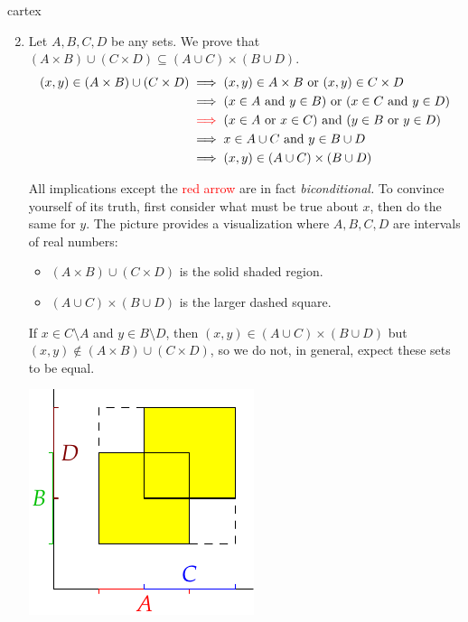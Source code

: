 \begin{examples}{}{cartex}
	\begin{enumerate}\setcounter{enumi}{1}
		\item\label{ex:cartex2}	Let $A,B,C,D$ be any sets. We prove that $(A\times B)\cup(C\times D)\subseteq(A\cup C)\times(B\cup D)$.
		\begin{align*}
			(x,y)\in(A\times B)\cup(C\times D)&\implies (x,y)\in A\times B \text{ or }(x,y)\in C\times D\\
			&\implies (x\in A\text{ and }y\in B)\text{ or }(x\in C\text{ and }y\in D)\\
			&\mathrel{\textcolor{red}{\implies}} (x\in A\text{ or }x\in C)\text{ and }(y\in B\text{ or }y\in D)\\
			&\implies x\in A\cup C\text{ and }y\in B\cup D\\
			&\implies (x,y)\in (A\cup C)\times(B\cup D)
		\end{align*}
		\begin{minipage}[t]{0.66\linewidth}\vspace{0pt}
			All implications except the \textcolor{red}{red arrow} are in fact \emph{biconditional.} To convince yourself of its truth, first consider what must be true about $x$, then do the same for $y$. The picture provides a visualization where $A,B,C,D$ are intervals of real numbers:
			\begin{itemize}\itemsep2pt
			  \item $(A\times B)\cup(C\times D)$ is the solid shaded region.
			  \item $(A\cup C)\times(B\cup D)$ is the larger dashed square.
			\end{itemize}  If $x\in C\setminus A$ and $y\in B\setminus D$, then $(x,y)\in (A\cup C)\times (B\cup D)$ but $(x,y)\not\in (A\times B)\cup(C\times D)$, so we do not, in general, expect these sets to be equal.
		\end{minipage}
		\hfill
		\begin{minipage}[t]{0.32\linewidth}\vspace{0pt}
			\hfill
			\includegraphics{setsii-04-cartesian}
		\end{minipage}
	\end{enumerate}
\end{examples} 



